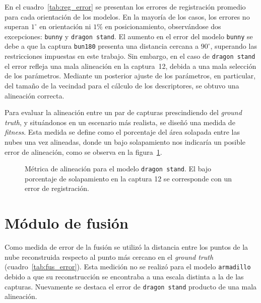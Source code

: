 	En el cuadro~\ref{tab:reg_error} se presentan los errores de registración promedio para cada orientación de los modelos.
	En la mayoría de los casos, los errores no superan $1^{\circ}$ en orientación ni $1\%$ en posicionamiento,
	observándose dos excepciones: \texttt{bunny} y \texttt{dragon stand}.
	El aumento en el error del modelo \texttt{bunny} se debe a que la captura \texttt{bun180} presenta una distancia cercana a $90^\circ$,
	superando las restricciones impuestas en este trabajo.
	Sin embargo, en el caso de \texttt{dragon stand} el error refleja una mala
	alineación en la captura~12, debida a una mala selección de los parámetros.
	Mediante un posterior ajuste de los parámetros, en particular, del tamaño de la vecindad para el cálculo de los descriptores, se obtuvo una alineación correcta.

	

	Para evaluar la alineación entre un par de capturas prescindiendo del \emph{ground truth}, y situándonos en un escenario más realista,
	se diseñó una medida de \emph{fitness}.
	Esta medida se define como el porcentaje del área solapada entre las nubes una vez alineadas,
	donde un bajo solapamiento nos indicaría un posible error de alineación, como
	se observa en la figura~\ref{fig:fitness}.


	\begin{figure}
		\centering
			
		\caption[Métrica de alineación para el modelo \texttt{dragon stand}]{\label{fig:fitness}Métrica de alineación para el modelo \texttt{dragon stand}. El bajo
		porcentaje de solapamiento en la captura 12 se corresponde
		con un error de registración.}
	\end{figure}


	\section{Módulo de fusión}

	Como medida de error de la fusión se utilizó la distancia entre los puntos de la nube reconstruida
	respecto al punto más cercano en el \emph{ground truth} (cuadro~\ref{tab:fus_error}).
	Esta medición no se realizó para el modelo \texttt{armadillo} debido a que su reconstrucción
	se encontraba a una escala distinta a la de las capturas.
	Nuevamente se destaca el error de \texttt{dragon stand} producto de una mala alineación.


